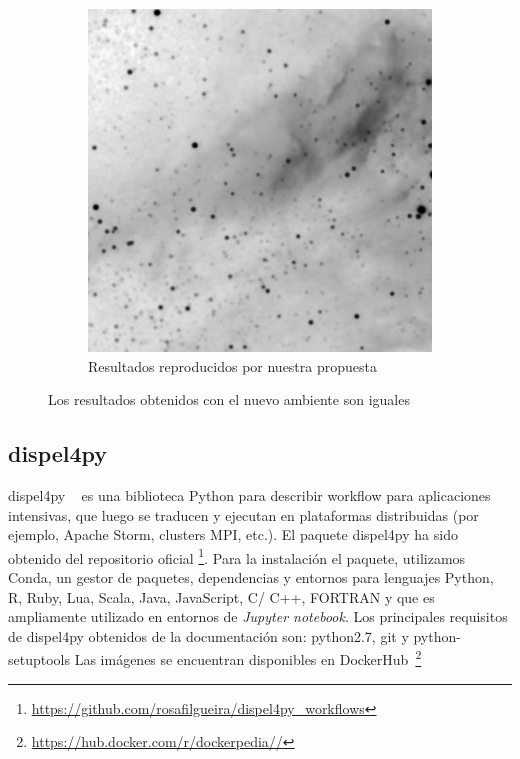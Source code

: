 \begin{figure}[h]
\begin{subfigure}[b]{0.4\textwidth}
         \includegraphics[width=\textwidth]{Figures/montage-mosorio}
         \caption{Resultados reproducidos por nuestra propuesta}
         \label{fig:montage-mosorio}
     \end{subfigure}
        \caption{Los resultados obtenidos con el nuevo ambiente son iguales}
        \label{fig:montage-results}
\end{figure}



\subsection{dispel4py}

dispel4py ~\cite{DBLP:conf/eScience/FilgueiraKAKSS15} es una biblioteca Python para describir workflow para aplicaciones intensivas, que luego se traducen y ejecutan en plataformas distribuidas (por ejemplo, Apache Storm, clusters MPI, etc.).
El paquete dispel4py ha sido obtenido del repositorio oficial \footnote{\url{https://github.com/rosafilgueira/dispel4py_workflows}}. 
Para la instalación el paquete, utilizamos Conda, un gestor de paquetes, dependencias y entornos para lenguajes Python, R, Ruby, Lua, Scala, Java, JavaScript, C/ C++, FORTRAN y que es ampliamente utilizado en entornos de \textit{Jupyter notebook}. 
Los principales requisitos de dispel4py obtenidos de la documentación son: python2.7, git y  python-setuptools
Las imágenes se encuentran disponibles en DockerHub~\footnote{\url{https://hub.docker.com/r/dockerpedia//}}



